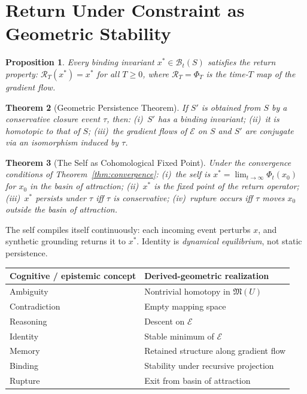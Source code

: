 \documentclass[11pt, letterpaper]{article}
\theoremstyle{plain}
\newtheorem{theorem}{Theorem}[section]
\newtheorem{proposition}[theorem]{Proposition}
\theoremstyle{definition}
\theoremstyle{remark}
\newcommand{\BI}{\mathcal{B}}
\newcommand{\MM}{\mathfrak{M}}
\newcommand{\EE}{\mathcal{E}}
\begin{document}
\section{Return Under Constraint as Geometric Stability}

\begin{proposition}
Every binding invariant $x^* \in \BI_t(S)$ satisfies the return property:
$\mathcal{R}_T(x^*) = x^*$ for all $T \geq 0$, where $\mathcal{R}_T = \Phi_T$ is the
time-$T$ map of the gradient flow.
\end{proposition}

\begin{theorem}[Geometric Persistence Theorem]
\label{thm:persist}
If $S'$ is obtained from $S$ by a conservative closure event $\tau$, then:
(i)~$S'$ has a binding invariant; (ii)~it is homotopic to that of $S$; (iii)~the
gradient flows of $\EE$ on $S$ and $S'$ are conjugate via an isomorphism induced by $\tau$.
\end{theorem}

\begin{theorem}[The Self as Cohomological Fixed Point]
\label{thm:self}
Under the convergence conditions of Theorem~\ref{thm:convergence}:
(i)~the self is $x^* = \lim_{t \to \infty} \Phi_t(x_0)$ for $x_0$ in the basin of
attraction; (ii)~$x^*$ is the fixed point of the return operator; (iii)~$x^*$
persists under $\tau$ iff $\tau$ is conservative; (iv)~rupture occurs iff $\tau$ moves
$x_0$ outside the basin of attraction.
\end{theorem}

The self compiles itself continuously: each incoming event perturbs $x$, and synthetic
grounding returns it to $x^*$. Identity is \emph{dynamical equilibrium}, not static
persistence.

\begin{center}
\begin{tabular}{@{}ll@{}}
\toprule
Cognitive / epistemic concept & Derived-geometric realization \\
\midrule
Ambiguity & Nontrivial homotopy in $\MM(U)$ \\
Contradiction & Empty mapping space \\
Reasoning & Descent on $\EE$ \\
Identity & Stable minimum of $\EE$ \\
Memory & Retained structure along gradient flow \\
Binding & Stability under recursive projection \\
Rupture & Exit from basin of attraction \\
\bottomrule
\end{tabular}
\end{center}
\end{document}
